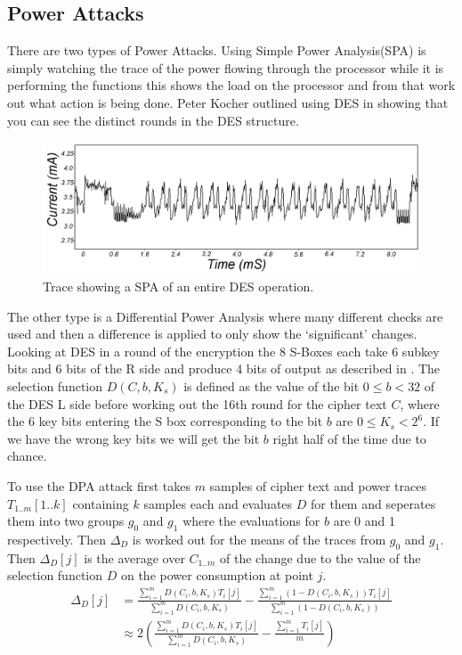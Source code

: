 \documentclass[a4paper,12pt]{article}
\begin{document}
\subsection{Power Attacks}
There are two types of Power Attacks. Using Simple Power Analysis(SPA) is simply watching the trace of the power flowing through the processor while it is performing the functions this shows the load on the processor and from that work out what action is being done. Peter Kocher outlined using DES in\cite{Systems} showing that you can see the distinct rounds in the DES structure. 

\begin{figure}
    \includegraphics[width=\textwidth]{SPAtrace.png}
    \caption{Trace showing a SPA of an entire DES operation.}
    \label{fig:desRound}
\end{figure}
The other type is a Differential Power Analysis where many different checks are used and then a difference is applied to only show the `significant' changes. Looking at DES in a round of the encryption the 8 S-Boxes each take 6 subkey bits and 6 bits of the R side and produce 4 bits of output as described in \cite{Kocher1999}. The selection function $D(C,b,K_s)$ is defined as the value of the bit $0 \le b < 32$ of the DES L side before working out the 16th round for the cipher text $C$, where the 6 key bits entering the S box corresponding to the bit $b$ are $0 \le K_s < 2^6$. If we have the wrong key bits we will get the bit $b$ right half of the time due to chance. 

To use the DPA attack first takes $m$ samples of cipher text and power traces $T_{1..m}[1..k]$ containing $k$ samples each and evaluates $D$ for them and seperates them into two groups $g_0$ and $g_1$ where the evaluations for $b$ are 0 and 1 respectively. Then $\Delta_D$ is worked out for the means of the traces from $g_0$ and $g_1$. Then $\Delta_D[j]$ is the average over $C_{1..m}$ of the change due to the value of the selection function $D$ on the power consumption at point $j$. 
\begin{align}
    \Delta_D[j] &= \frac{\sum_{i=1}^mD(C_i,b,K_s)T_i[j]}{\sum_{i=1}^mD(C_i,b,K_s)} -  \frac{\sum_{i=1}^m(1-D(C_i,b,K_s))T_i[j]}{\sum_{i=1}^m(1-D(C_i,b,K_s))}\\
    &\approx 2( \frac{\sum_{i=1}^mD(C_i,b,K_s)T_i[j]}{\sum_{i=1}^mD(C_i,b,K_s)} - \frac{\sum_{i=1}^mT_i[j]}{m}) 
\end{align}
\end{document}
